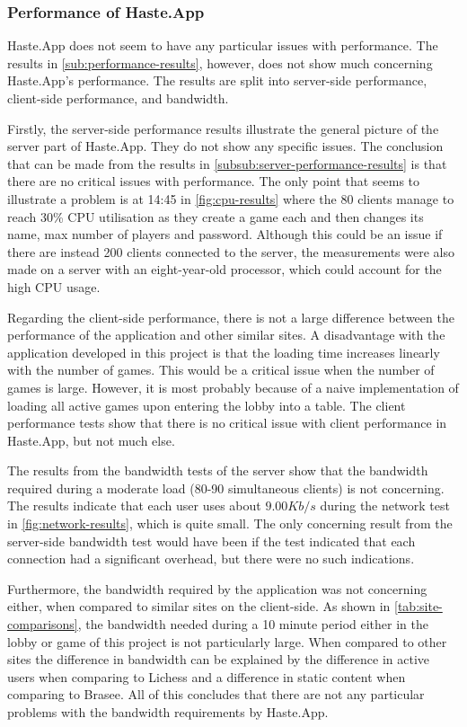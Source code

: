 \documentclass[a4paper]{article}
\begin{document}
\subsubsection{Performance of Haste.App}
Haste.App does not seem to have any particular issues with performance. The results in \cref{sub:performance-results}, however, does not show much concerning Haste.App's performance. The results are split into server-side performance, client-side performance, and bandwidth.

Firstly, the server-side performance results illustrate the general picture of the server part of Haste.App. They do not show any specific issues. The conclusion that can be made from the results in \cref{subsub:server-performance-results} is that there are no critical issues with performance. The only point that seems to illustrate a problem is at 14:45 in \cref{fig:cpu-results} where the 80 clients manage to reach 30\% CPU utilisation as they create a game each and then changes its name, max number of players and password. Although this could be an issue if there are instead 200 clients connected to the server, the measurements were also made on a server with an eight-year-old processor, which could account for the high CPU usage.

Regarding the client-side performance, there is not a large difference between the performance of the application and other similar sites. A disadvantage with the application developed in this project is that the loading time increases linearly with the number of games. This would be a critical issue when the number of games is large. However, it is most probably because of a naive implementation of loading all active games upon entering the lobby into a table. The client performance tests show that there is no critical issue with client performance in Haste.App, but not much else.

The results from the bandwidth tests of the server show that the bandwidth required during a moderate load (80-90 simultaneous clients) is not concerning. The results indicate that each user uses about $9.00Kb/s$ during the network test in \cref{fig:network-results}, which is quite small. The only concerning result from the server-side bandwidth test would have been if the test indicated that each connection had a significant overhead, but there were no such indications.

Furthermore, the bandwidth required by the application was not concerning either, when compared to similar sites on the client-side. As shown in \cref{tab:site-comparisons}, the bandwidth needed during a 10 minute period either in the lobby or game of this project is not particularly large. When compared to other sites the difference in bandwidth can be explained by the difference in active users when comparing to Lichess and a difference in static content when comparing to Brasee. All of this concludes that there are not any particular problems with the bandwidth requirements by Haste.App.
\end{document}
